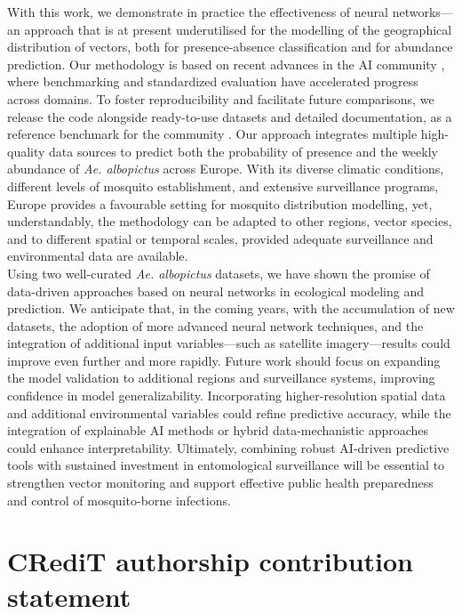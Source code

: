 \documentclass[preprint,12pt]{elsarticle}
\begin{document}
With this work, we demonstrate in practice the effectiveness of neural networks---an approach that is at present underutilised for the modelling of the geographical distribution of vectors, both for presence-absence classification and for abundance prediction. Our methodology is based on recent advances in the AI community \cite{kraemer2025}, where benchmarking and standardized evaluation have accelerated progress across domains. To foster reproducibility and facilitate future comparisons, we release the code alongside ready-to-use datasets and detailed documentation, as a reference benchmark for the community \cite{github2024aiedes, biazzo2026_datasets}. Our approach integrates multiple high-quality data sources to predict both the probability of presence and the weekly abundance of \textit{Ae. albopictus} across Europe. With its diverse climatic conditions, different levels of mosquito establishment, and extensive surveillance programs, Europe provides a favourable setting for mosquito distribution modelling, yet, understandably, the methodology can be adapted to other regions, vector species, and to different spatial or temporal scales, provided adequate surveillance and environmental data are available.\\

Using two well-curated \textit{Ae. albopictus} datasets, we have shown the promise of data-driven approaches based on neural networks in ecological modeling and prediction. We anticipate that, in the coming years, with the accumulation of new datasets, the adoption of more advanced neural network techniques, and the integration of additional input variables---such as satellite imagery---results could improve even further and more rapidly. Future work should focus on expanding the model validation to additional regions and surveillance systems, improving confidence in model generalizability. Incorporating higher-resolution spatial data and additional environmental variables could refine predictive accuracy, while the integration of explainable AI methods or hybrid data-mechanistic approaches could enhance interpretability. Ultimately, combining robust AI-driven predictive tools with sustained investment in entomological surveillance will be essential to strengthen vector monitoring and support effective public health preparedness and control of mosquito-borne infections.

\section*{CRediT authorship contribution statement}
\end{document}
